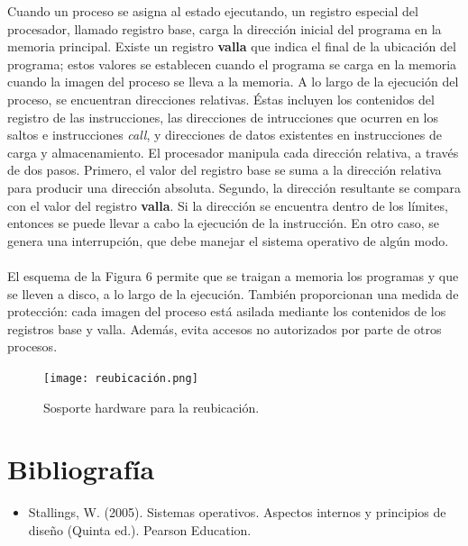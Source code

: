 \documentclass[12pt, a4paper]{article}
\begin{document}
Cuando un proceso se asigna al estado ejecutando, un registro especial del procesador, llamado registro base, carga la dirección inicial del programa en la memoria principal. Existe un registro \textbf{valla} que indica el final de la ubicación del programa; estos valores se establecen cuando el programa se carga en la memoria cuando la imagen del proceso se lleva a la memoria. A lo largo de la ejecución del proceso, se encuentran direcciones relativas. Éstas incluyen los contenidos del registro de las instrucciones, las direcciones de intrucciones que ocurren en los saltos e instrucciones \textit{call}, y direcciones de datos existentes en instrucciones de carga y almacenamiento. El procesador manipula cada dirección relativa, a través de dos pasos. Primero, el valor del registro base se suma a la dirección relativa para producir una dirección absoluta. Segundo, la dirección resultante se compara con el valor del registro \textbf{valla}. Si la dirección se encuentra dentro de los límites, entonces se puede llevar a cabo la ejecución de la instrucción. En otro caso, se genera una interrupción, que debe manejar el sistema operativo de algún modo. \\\\ 
El esquema de la Figura 6 permite que se traigan a memoria los programas y que se lleven a disco, a lo largo de la ejecución. También proporcionan una medida de protección: cada imagen del proceso está asilada mediante los contenidos de los registros base y valla. Además, evita accesos no autorizados por parte de otros procesos.
\begin{figure}[H]
    \centering
    \texttt{[image: reubicación.png]}
    \caption{Sosporte hardware para la reubicación.}
\end{figure}











\section {Bibliografía}
\begin{itemize}
    \item Stallings, W. (2005). Sistemas operativos. Aspectos internos y principios de diseño (Quinta ed.). Pearson Education.
\end{itemize}
\end{document}
